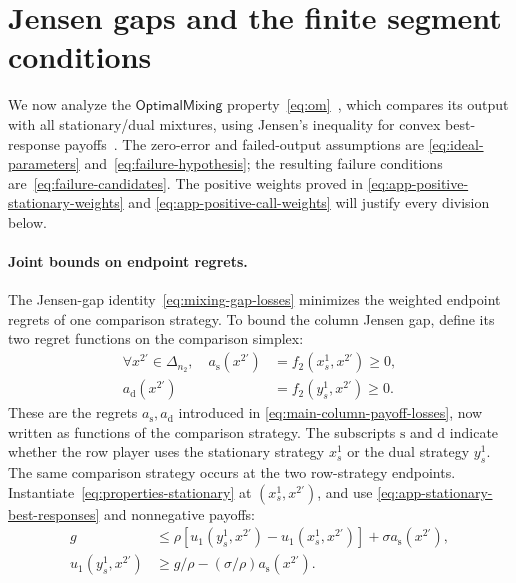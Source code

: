 \documentclass[11pt]{article}
\theoremstyle{remark}
\theoremstyle{plain}
\newcommand{\om}{\mathsf{OptimalMixing}}
\begin{document}
\section{Jensen gaps and the finite segment conditions}
\label{app:mixing}

We now analyze the $\om$ property~\eqref{eq:om}~\cite{mixing2025}, which
compares its output with all stationary/dual mixtures, using Jensen's inequality for convex
best-response payoffs~\cite{boyd2004}.
The zero-error and failed-output assumptions are
\eqref{eq:ideal-parameters} and~\eqref{eq:failure-hypothesis};
the resulting failure conditions are~\eqref{eq:failure-candidates}.
The positive weights proved in
\eqref{eq:app-positive-stationary-weights} and
\eqref{eq:app-positive-call-weights} will justify every division below.

\paragraph{Joint bounds on endpoint regrets.}
The Jensen-gap identity~\eqref{eq:mixing-gap-losses} minimizes
the weighted endpoint regrets of one comparison strategy.
To bound the column Jensen gap, define its two regret functions on
the comparison simplex:
\begin{equation}
 \begin{aligned}
 \forall x^{2\prime}\in\Delta_{n_2},\quad
 a_{\mathrm s}(x^{2\prime})&=f_2(x_s^1,x^{2\prime})\ge0,\\
 a_{\mathrm d}(x^{2\prime})&=f_2(y_s^1,x^{2\prime})\ge0.
 \end{aligned}
 \label{eq:app-column-endpoint-losses}
\end{equation}
These are the regrets $a_{\mathrm s},a_{\mathrm d}$ introduced in
\eqref{eq:main-column-payoff-losses}, now written as functions of
the comparison strategy. The subscripts $\mathrm s$ and $\mathrm d$
indicate whether the row player uses the stationary strategy $x_s^1$
or the dual strategy $y_s^1$.
The same comparison strategy occurs at the two row-strategy endpoints.
Instantiate~\eqref{eq:properties-stationary} at
$(x_s^1,x^{2\prime})$, and use
\eqref{eq:app-stationary-best-responses} and nonnegative payoffs:
\begin{equation}
 \begin{aligned}
 g&\le\rho[u_1(y_s^1,x^{2\prime})-u_1(x_s^1,x^{2\prime})]
                         +\sigma a_{\mathrm s}(x^{2\prime}),\\
 u_1(y_s^1,x^{2\prime})
 &\ge g/\rho-(\sigma/\rho)a_{\mathrm s}(x^{2\prime}).
 \end{aligned}
 \label{eq:app-column-loss-stationary-test}
\end{equation}
\end{document}
